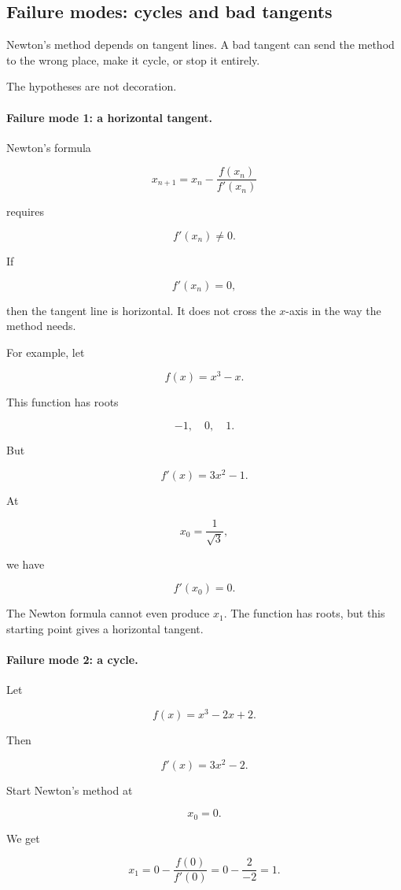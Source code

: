 \subsection{Failure modes: cycles and bad tangents}
\label{subsec:newton-failure-modes}

Newton's method depends on tangent lines.  A bad tangent can send the method to
the wrong place, make it cycle, or stop it entirely.

The hypotheses are not decoration.

\paragraph{Failure mode 1: a horizontal tangent.}
Newton's formula

\[
x_{n+1}=x_n-\frac{f(x_n)}{f'(x_n)}
\]

requires

\[
f'(x_n)\neq0.
\]

If

\[
f'(x_n)=0,
\]

then the tangent line is horizontal.  It does not cross the \(x\)-axis in the way the
method needs.

For example, let

\[
f(x)=x^3-x.
\]

This function has roots

\[
-1,\quad 0,\quad 1.
\]

But

\[
f'(x)=3x^2-1.
\]

At

\[
x_0=\frac{1}{\sqrt3},
\]

we have

\[
f'(x_0)=0.
\]

The Newton formula cannot even produce \(x_1\).  The function has roots, but this
starting point gives a horizontal tangent.

\paragraph{Failure mode 2: a cycle.}
Let

\[
f(x)=x^3-2x+2.
\]

Then

\[
f'(x)=3x^2-2.
\]

Start Newton's method at

\[
x_0=0.
\]

We get

\[
x_1
=
0-\frac{f(0)}{f'(0)}
=
0-\frac{2}{-2}
=
1.
\]

